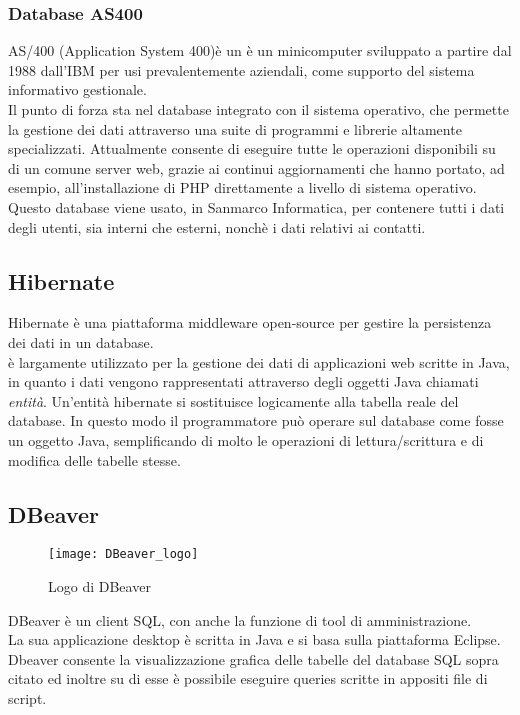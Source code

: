 \subsubsection{Database AS400}
AS/400 (Application System 400)è un è un minicomputer sviluppato a partire dal 1988 dall’IBM per usi prevalentemente aziendali, come supporto del sistema informativo gestionale.\\
Il punto di forza sta nel database integrato con il sistema operativo, che permette la gestione dei dati attraverso una suite di programmi e librerie altamente specializzati. Attualmente consente di eseguire tutte le operazioni disponibili su di un comune server web, grazie ai continui aggiornamenti che hanno portato, ad esempio, all'installazione di PHP direttamente a livello di sistema operativo.
Questo database viene usato, in Sanmarco Informatica, per contenere tutti i dati degli utenti, sia interni che esterni, nonchè i dati relativi ai contatti. %
\subsection{Hibernate}
Hibernate è una piattaforma \gls{middleware} open-source per gestire la persistenza dei dati in un database.\\
è largamente utilizzato per la gestione dei dati di applicazioni web scritte in Java, in quanto i dati vengono rappresentati attraverso degli oggetti Java chiamati \emph{entità}.
Un'entità hibernate si sostituisce logicamente alla tabella reale del database. In questo modo il programmatore può operare sul database come fosse un oggetto Java, semplificando di molto le operazioni di lettura/scrittura e di modifica delle tabelle stesse.

\newpage

\subsection{DBeaver}

\begin{figure}[h]
	\centering
	\texttt{[image: DBeaver\_logo]}
	\caption{Logo di DBeaver}
\end{figure}
DBeaver è un client SQL, con anche la funzione di tool di amministrazione.\\
La sua applicazione desktop è scritta in Java e si basa sulla piattaforma Eclipse.\\
Dbeaver consente la visualizzazione grafica delle tabelle del database SQL sopra citato ed inoltre su di esse è possibile eseguire queries scritte in appositi file di script.
